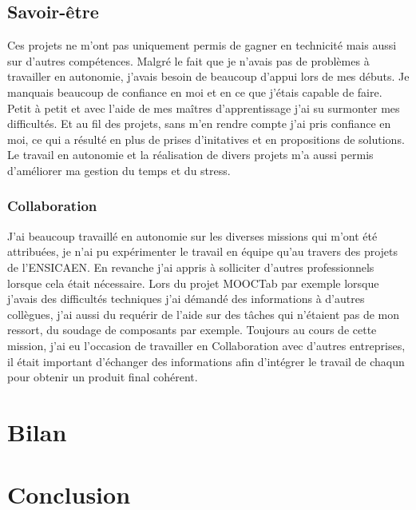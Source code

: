 \documentclass[french,12pt,a4paper,titlepage,openright,openbib]{report}
\begin{document}
\section{Savoir-être}
Ces projets ne m'ont pas uniquement permis de gagner en technicité mais aussi sur d'autres compétences.
Malgré le fait que je n'avais pas de problèmes à travailler en autonomie, j'avais besoin de beaucoup d'appui lors de mes débuts. Je manquais beaucoup de confiance en moi et en ce que j'étais capable de faire. Petit à petit et avec l'aide de mes maîtres d'apprentissage j'ai su surmonter mes difficultés.
Et au fil des projets, sans m'en rendre compte j'ai pris confiance en moi, ce qui a résulté en plus de prises d'initatives et en propositions de solutions.
Le travail en autonomie et la réalisation de divers projets m'a aussi permis d'améliorer ma gestion du temps et du stress.
\subsection{Collaboration}
J'ai beaucoup travaillé en autonomie sur les diverses missions qui m'ont été attribuées, je n'ai pu expérimenter le travail en équipe qu'au travers des projets de l'ENSICAEN. En revanche j'ai appris à solliciter d'autres professionnels lorsque cela était nécessaire. Lors du projet MOOCTab par exemple lorsque j'avais des difficultés techniques j'ai démandé des informations à d'autres collègues, j'ai aussi du requérir de l'aide sur des tâches qui n'étaient pas de mon ressort, du soudage de composants par exemple. Toujours au cours de cette mission, j'ai eu l'occasion de travailler en Collaboration avec d'autres entreprises, il était important d'échanger des informations afin d'intégrer le travail de chaqun pour obtenir un produit final cohérent.
\chapter{Bilan}
\lipsum[6-7]
\chapter{Conclusion}
\lipsum[8-9]

\printglossary[title={Glossaire}]



	
\end{document}
